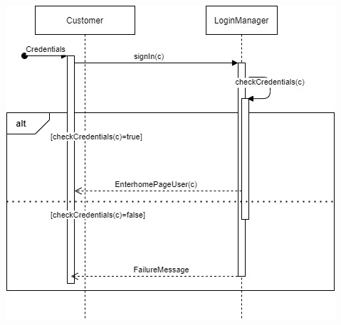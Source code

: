 \documentclass[a4paper, 12pt, oneside]{article}
\begin{document}
\begin{minipage}{\linewidth}
            \centering
           \includegraphics[height=0.47\textheight, scale=1, keepaspectratio]{img/seq_diag/Login.jpg}
\end{minipage}
\end{document}
